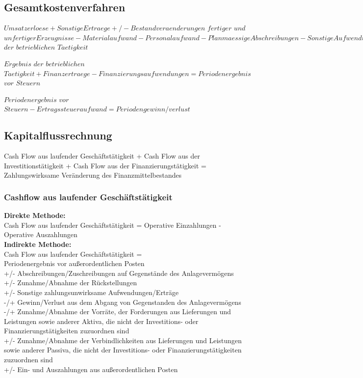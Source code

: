\documentclass{article}
\begin{document}
\subsection{Gesamtkostenverfahren}
\begin{center}
$ Umsatzerloese + Sonstige Ertraege +/- Bestandveraenderungen$ $fertiger$ $und$ $unfertiger Erzeugnisse - Materialaufwand - Personalaufwand - Planmaessige Abschreibungen - Sonstige Aufwendungen = Ergebnis$ $der$ $betrieblichen$ $Taetigkeit  $
\end{center}
\begin{center}
$ Ergebnis$ $der$ $betrieblichen$ $Taetigkeit + Finanzertraege - Finanzierungsaufwendungen = Periodenergebnis$ $vor$ $Steuern $
\end{center}
\begin{center}
$ Periodenergebnis$ $vor$ $Steuern - Ertragssteueraufwand = Periodengewinn/verlust  $ 
\end{center}
 

\subsection{Kapitalflussrechnung}

Cash Flow aus laufender Geschäftstätigkeit
+ Cash Flow aus der Investitionstätigkeit
+ Cash Flow aus der Finanzierungstätigkeit
= Zahlungswirksame Veränderung des Finanzmittelbestandes

\subsubsection{Cashflow aus laufender Geschäftstätigkeit}

\textbf{Direkte Methode:}\\
Cash Flow aus laufender Geschäftstätigkeit = Operative Einzahlungen - Operative Auszahlungen \\
\textbf{Indirekte Methode:}\\
Cash Flow aus laufender Geschäftstätigkeit = \\
Periodenergebnis vor außerordentlichen Posten\\
+/- Abschreibungen/Zuschreibungen auf Gegenstände des Anlagevermögens\\
+/- Zunahme/Abnahme der Rückstellungen\\
+/- Sonstige zahlungsunwirksame Aufwendungen/Erträge\\
-/+ Gewinn/Verlust aus dem Abgang von Gegenstanden des Anlagevermögens\\
-/+ Zunahme/Abnahme der Vorräte, der Forderungen aus Lieferungen und Leistungen sowie anderer Aktiva, die nicht der Investitions- oder Finanzierungstätigkeiten zuzuordnen sind \\
+/- Zunahme/Abnahme der Verbindlichkeiten aus Lieferungen und Leistungen sowie anderer Passiva, die nicht der Investitions- oder Finanzierungstätigkeiten zuzuordnen sind\\
+/- Ein- und Auszahlungen aus außerordentlichen Posten\\
\end{document}
